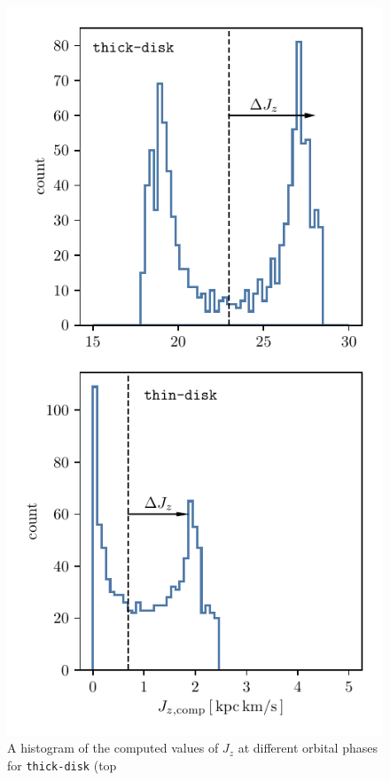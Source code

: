 \documentclass[twocolumn]{aastex62}
\newcommand{\thick}{\texttt{thick-disk}}
\begin{document}
\begin{figure}
\begin{center}
\includegraphics[width=\columnwidth]{fig/schmactions_Jz_zerr_hist.pdf}
\end{center}
\caption{A histogram of the computed values of $J_z$ at different orbital phases for \thick{} (top
}
\end{figure}
\end{document}
